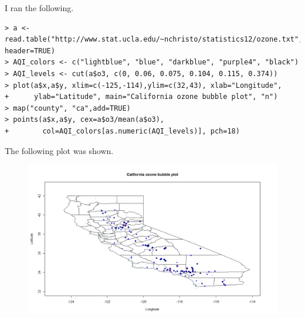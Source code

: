 \documentclass[12pt]{article}
\begin{document}
I ran the following.
\scriptsize
\begin{verbatim}
> a <- read.table("http://www.stat.ucla.edu/~nchristo/statistics12/ozone.txt", header=TRUE)
> AQI_colors <- c("lightblue", "blue", "darkblue", "purple4", "black")
> AQI_levels <- cut(a$o3, c(0, 0.06, 0.075, 0.104, 0.115, 0.374))
> plot(a$x,a$y, xlim=c(-125,-114),ylim=c(32,43), xlab="Longitude",
+      ylab="Latitude", main="California ozone bubble plot", "n")
> map("county", "ca",add=TRUE)
> points(a$x,a$y, cex=a$o3/mean(a$o3),
+        col=AQI_colors[as.numeric(AQI_levels)], pch=18)
\end{verbatim}
\normalsize
The following plot was shown.
\begin{figure}[H]
    \begin{center}
        \includegraphics[width=5in]{section6problem1.png}
    \end{center}
\end{figure}
\end{document}
